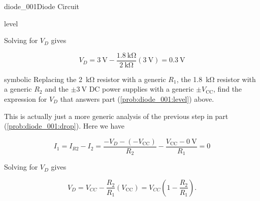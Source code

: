 \begin{mainquestion}{diode_001}{Diode Circuit}
\begin{partquestion}{level}
\begin{answer}
Solving for $V_D$ gives

\[
V_D
=
\qty{3}{\volt}
-
\frac{\qty{1.8}{\kilo\ohm}}{\qty{2}{\kilo\ohm}}
\left(\qty{3}{\volt}\right)
=
\qty{0.3}{\volt}
\]
\end{answer}
\end{partquestion}

\begin{partquestion}{symbolic}
{Replacing the \qty{2}{\kilo\ohm} resistor with a generic $R_1$, the \qty{1.8}{\kilo\ohm} resistor with a generic $R_2$ and the $\pm\qty{3}{\volt}$ DC power supplies with a generic $\pm V_{\text{CC}}$, find the expression for $V_D$ that answers part (\cref{prob:diode_001:level}) above.}
\begin{answer}
This is actually just a more generic analysis of the previous step in part (\cref{prob:diode_001:drop}). Here we have

\[
I_1
=
I_{R2}
-
I_2
=
\frac{-V_D-(-V_{\text{CC}})}{R_2}
-
\frac{V_{\text{CC}}-\qty{0}{\volt}}{R_1}
=
0
\]

Solving for $V_D$ gives

\[
V_D
=
V_{CC}
-
\frac{R_2}{R_1}\left(V_{\text{CC}}\right)
=
V_{CC}\left(1-\frac{R_2}{R_1}\right).
\]
\end{answer}
\end{partquestion}

\end{mainquestion}